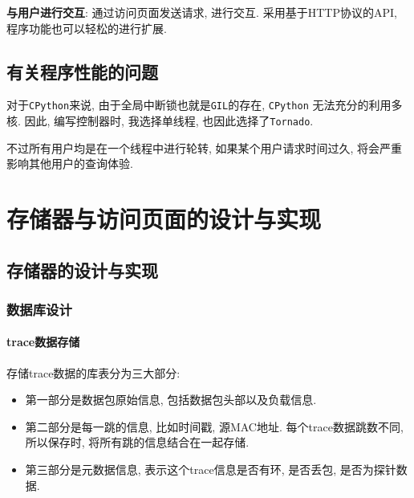 \textbf{与用户进行交互}: 通过访问页面发送请求, 进行交互. 采用基于HTTP协议的API,
程序功能也可以轻松的进行扩展.


\section{有关程序性能的问题}

  对于\texttt{CPython}来说, 由于全局中断锁也就是\texttt{GIL}的存在, \texttt{CPython}
无法充分的利用多核. 因此, 编写控制器时, 我选择单线程, 也因此选择了\texttt{Tornado}.

 不过所有用户均是在一个线程中进行轮转, 如果某个用户请求时间过久,
将会严重影响其他用户的查询体验.

\chapter{存储器与访问页面的设计与实现}

\section{存储器的设计与实现}

\subsection{数据库设计}
\label{sec:数据库设计}

\subsubsection{trace数据存储}

存储trace数据的库表分为三大部分:

\begin{itemize}
    \setlength\itemsep{0.1em}
    \item 第一部分是数据包原始信息, 包括数据包头部以及负载信息.
    \item 第二部分是每一跳的信息, 比如时间戳, 源MAC地址. 每个trace数据跳数不同,
            所以保存时, 将所有跳的信息结合在一起存储.
    \item 第三部分是元数据信息, 表示这个trace信息是否有环, 是否丢包,
            是否为探针数据.
\end{itemize}


